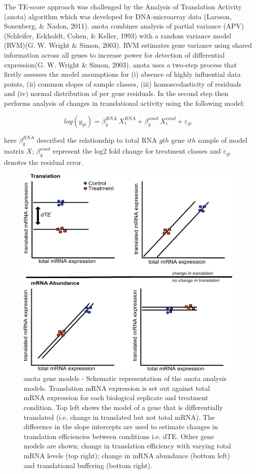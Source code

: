 \documentclass[12pt,openany]{book}
\begin{document}
The TE-score approach was challenged by the Analysis of Translation
Activity (anota) algorithm which was developed for DNA-microarray data
(Larsson, Sonenberg, \& Nadon, 2011). anota combines analysis of partial
variance (APV)(Schleifer, Eckholdt, Cohen, \& Keller, 1993) with a
random variance model (RVM)(G. W. Wright \& Simon, 2003). RVM estimates
gene variance using shared information across all genes to increase
power for detection of differential expression(G. W. Wright \& Simon,
2003). anota uses a two-step process that firstly assesses the model
assumptions for (i) absence of highly influential data points, (ii)
common slopes of sample classes, (iii) homoscedasticity of residuals and
(iv) normal distribution of per gene residuals. In the second step then
performs analysis of changes in translational activity using the
following model:

\[log(y_{gi}) = \beta_g^{RNA}\ X_i^{RNA}+ \beta_g^{cond}\ X_i^{cond} + \varepsilon_{gi}\]

here \(\beta_g^{RNA}\) described the relationship to total RNA \(gth\)
gene \(ith\) sample of model matrix \(X\); \(\beta_g^{cond}\) represent
the log2 fold change for treatment classes and \(\varepsilon_{gi}\)
denotes the residual error.

\begin{figure}
  \includegraphics{./figures/geneModes_anota_Larsson.pdf}
  \caption{anota gene models - Schematic representation of the anota analysis models. Translation mRNA expression is set out against total mRNA expression for each biological replicate and treatment condition. Top left shows the model of a gene that is differentially translated (i.e. change in translated but not total mRNA). The difference in the slope intercepts are used to estimate changes in translation efficiencies between conditions i.e. dTE. Other gene models are shown; change in translation efficiency with varying total mRNA levels (top right); change in mRNA abundance (bottom left) and translational buffering (bottom right).
  \label{fig:anota}}
\end{figure}
\end{document}
